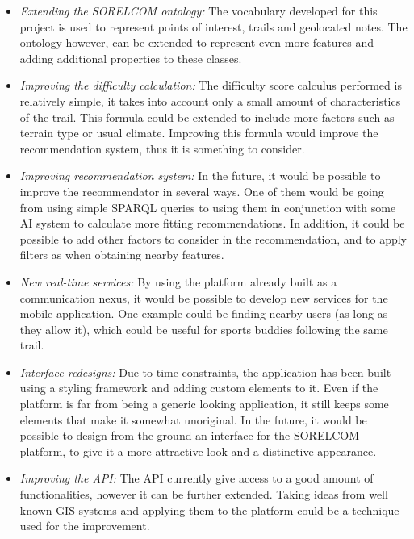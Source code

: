 \begin{itemize}
\item \textit{Extending the SORELCOM ontology:} The vocabulary developed for this project is used to represent points of interest, trails and geolocated notes. The ontology however, can be extended to represent even more features and adding additional properties to these classes.

\item \textit{Improving the difficulty calculation:} The difficulty score calculus performed is relatively simple, it takes into account only a small amount of characteristics of the trail. This formula could be extended to include more factors such as terrain type or usual climate. Improving this formula would improve the recommendation system, thus it is something to consider.

\item \textit{Improving recommendation system:} In the future, it would be possible to improve the recommendator in several ways. One of them would be going from using simple SPARQL queries to using them in conjunction with some AI system to calculate more fitting recommendations. In addition, it could be possible to add other factors to consider in the recommendation, and to apply filters as when obtaining nearby features.

\item \textit{New real-time services:} By using the platform already built as a communication nexus, it would be possible to develop new services for the mobile application. One example could be finding nearby users (as long as they allow it), which could be useful for sports buddies following the same trail.

\item \textit{Interface redesigns:} Due to time constraints, the application has been built using a styling framework and adding custom elements to it. Even if the platform is far from being a generic looking application, it still keeps some elements that make it somewhat unoriginal. In the future, it would be possible to design from the ground an interface for the SORELCOM platform, to give it a more attractive look and a distinctive appearance.

\item \textit{Improving the API:} The API currently give access to a good amount of functionalities, however it can be further extended. Taking ideas from well known GIS systems and applying them to the platform could be a technique used for the improvement.

\end{itemize}
